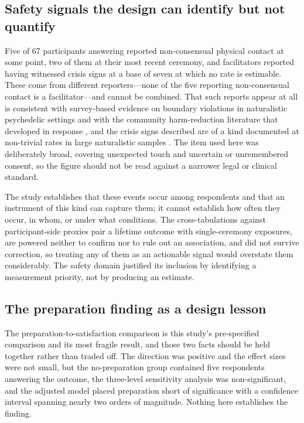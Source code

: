 \documentclass[12pt]{article}
\begin{document}
\subsection{Safety signals the design can identify but not quantify}

Five of 67 participants answering reported non-consensual physical contact at some point, two of them at
their most recent ceremony, and facilitators reported having witnessed crisis signs at a base of seven at
which no rate is estimable. These come from different reporters---none of the five reporting
non-consensual contact is a facilitator---and cannot be combined. That such reports appear at all is
consistent with survey-based evidence on boundary violations in naturalistic psychedelic settings
\citep{kruger2025psychedelic,mcnamee2023studying} and with the community harm-reduction literature that
developed in response \citep{peluso2020reflections}, and the crisis signs described are of a kind
documented at non-trivial rates in large naturalistic samples
\citep{carbonaro2016survey,bouso2022adverse}. The item used here was deliberately broad, covering
unexpected touch and uncertain or unremembered consent, so the figure should not be read against a narrower
legal or clinical standard.

The study establishes that these events occur among respondents and that an instrument of this kind can
capture them; it cannot establish how often they occur, in whom, or under what conditions. The
cross-tabulations against participant-side proxies pair a lifetime outcome with single-ceremony exposures,
are powered neither to confirm nor to rule out an association, and did not survive correction, so treating
any of them as an actionable signal would overstate them considerably. The safety domain justified its
inclusion by identifying a measurement priority, not by producing an estimate.

\subsection{The preparation finding as a design lesson}

The preparation-to-satisfaction comparison is this study's pre-specified comparison and its most fragile
result, and those two facts should be held together rather than traded off. The direction was positive and
the effect sizes were not small, but the no-preparation group contained five respondents answering the
outcome, the three-level sensitivity analysis was non-significant, and the adjusted model placed
preparation short of significance with a confidence interval spanning nearly two orders of magnitude.
Nothing here establishes the finding.
\end{document}
